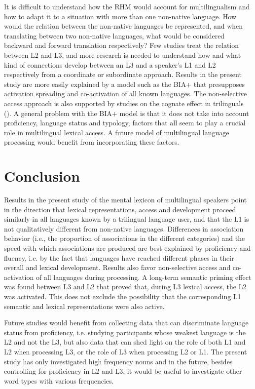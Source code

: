 \documentclass[output=paper,colorlinks,citecolor=brown,nonflat]{langsci/langscibook}
\begin{document}
It is difficult to understand how the RHM would account for multilingualism and how to adapt it to a situation with more than one non-native language. How would the relation between the non-native languages be represented, and when translating between two non-native languages, what would be considered backward and forward translation respectively? Few studies treat the relation between L2 and L3, and more research is needed to understand how and what kind of connections develop between an L3 and a speaker’s L1 and L2 respectively from a coordinate or subordinate approach. Results in the present study are more easily explained by a model such as the BIA+ that presupposes activation spreading and co-activation of all known languages. The non-selective access approach is also supported by studies on the cognate effect in trilinguals (\citealt{LemhöferEtAl2004, Szubko-Sitarek2011}). A general problem with the BIA+ model is that it does not take into account proficiency, language status and typology, factors that all seem to play a crucial role in multilingual lexical access. A future model of multilingual language processing would benefit from incorporating these factors.

\section{Conclusion}\label{sec:gudmundson:5}

Results in the present study of the mental lexicon of multilingual speakers point in the direction that lexical representations, access and development proceed similarly in all languages known by a trilingual language user, and that the L1 is not qualitatively different from non-native languages. Differences in association behavior (i.e., the proportion of associations in the different categories) and the speed with which associations are produced are best explained by proficiency and fluency, i.e. by the fact that languages have reached different phases in their overall and lexical development. Results also favor non-selective access and co-activation of all languages during processing. A long-term semantic priming effect was found between L3 and L2 that proved that, during L3 lexical access, the L2 was activated. This does not exclude the possibility that the corresponding L1 semantic and lexical representations were also active.

Future studies would benefit from collecting data that can discriminate language status from proficiency, i.e. studying participants whose weakest language is the L2 and not the L3, but also data that can shed light on the role of both L1 and L2 when processing L3, or the role of L3 when processing L2 or L1. The present study has only investigated high frequency nouns and in the future, besides controlling for proficiency in L2 and L3, it would be useful to investigate other word types with various frequencies.

{\sloppy\printbibliography[heading=subbibliography,notkeyword=this]}
\end{document}
